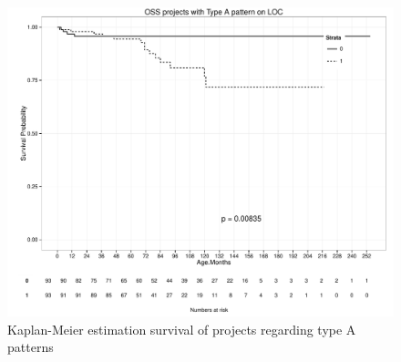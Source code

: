 \begin{figure}[H]
\caption{Kaplan-Meier estimation survival of projects regarding type A
patterns}\label{figure:kp_survival}
\centering
	\includegraphics[width=386pt]{images/survival_LOC.pdf}
\end{figure}